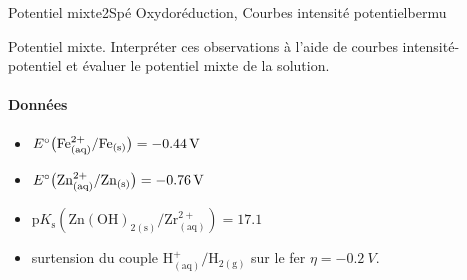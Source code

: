 
\begin{exercise}{Potentiel mixte}{2}{Spé}
{Oxydoréduction, Courbes intensité potentiel}{bermu}

\begin{questions}
    \questioncours Potentiel mixte.
    \question Interpréter ces observations à l’aide de courbes intensité-potentiel et évaluer le potentiel mixte de la solution.
\end{questions}

\paragraph{Données}

\begin{itemize}
    \item $E^\circ\qty\big(\mathrm{Fe^{2+}_{(aq)}/Fe_{(s)}}) = \SI{-0.44}{V}$
    \item $E^\circ\qty\big(\mathrm{Zn^{2+}_{(aq)}/Zn_{(s)}}) = \SI{-0.76}{V}$
    \item $\text{p}K_\text{s}(\mathrm{Zn(OH)_{2(s)}/Zr^{2+}_{(aq)}}) = 17.1$
    \item surtension du couple $\mathrm{H^+_{(aq)}/H_{2(g)}}$ sur le fer $\eta = \SI{-0.2}{V}$.
\end{itemize}

\end{exercise}

